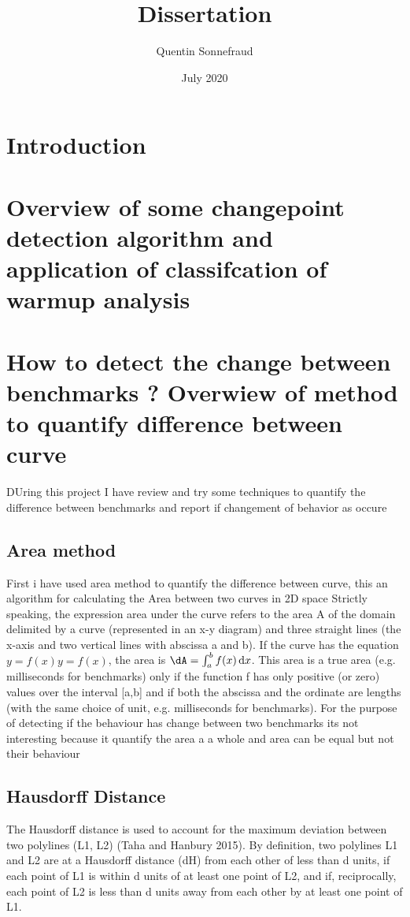\documentclass{article}
\title{Dissertation}
\author{Quentin Sonnefraud}
\date{July 2020}
\begin{document}
\maketitle


\section{Introduction}

\section{Overview of some changepoint detection algorithm and application of classifcation of warmup analysis}

\section{ How to detect the change between benchmarks ? Overwiew of method to quantify difference between curve}

DUring this project I have review and try some techniques to quantify the difference between benchmarks and report if changement of behavior as occure

\subsection{Area method}

First i have used area method to quantify the difference between curve, this an algorithm for calculating the Area between two curves in 2D space
Strictly speaking, the expression area under the curve refers to the area A of the domain delimited by a curve (represented in an x-y diagram) and three straight lines (the x-axis and two vertical lines with abscissa a and b). If the curve has the equation $y=f(x)y=f(x)$, the area is $\dA=\int _{a}^{b}f(x)\,\mathrm {d} x$. This area is a true area (e.g. milliseconds for benchmarks) only if the function f has only positive (or zero) values over the interval [a,b] and if both the abscissa and the ordinate are lengths (with the same choice of unit, e.g. milliseconds for benchmarks).
For the purpose of detecting if the behaviour has change between two benchmarks its not interesting because it quantify the area a a whole and area can be equal but not their behaviour

\subsection{Hausdorff Distance }
The Hausdorff distance is used to account for the maximum deviation between two polylines (L1, L2) (Taha and Hanbury 2015). By definition, two polylines L1 and L2 are at a Hausdorff distance (dH) from each other of less than d units, if each point of L1 is within d units of at least one point of L2, and if, reciprocally, each point of L2 is less than d units away from each other by at least one
point of L1.
\end{document}
